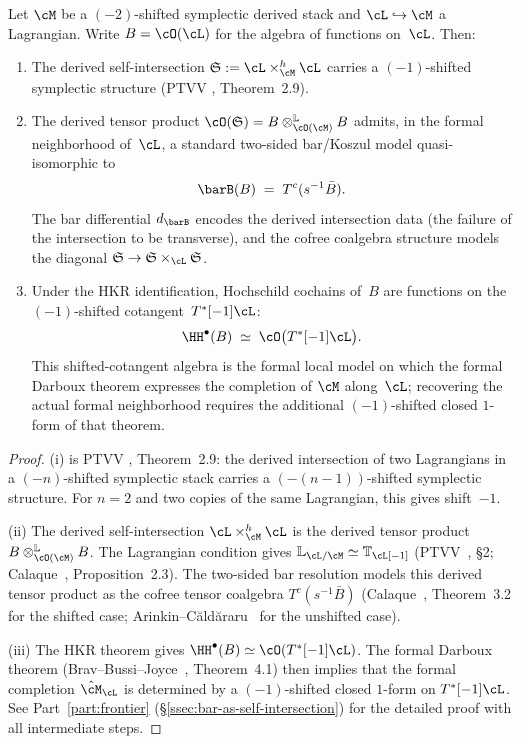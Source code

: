 \begin{theorem}
\label{thm:bar-is-self-intersection}
Let $\cM$ be a $(-2)$-shifted symplectic derived stack and
$\cL \hookrightarrow \cM$ a Lagrangian. Write
$B = \cO(\cL)$ for the algebra of functions on~$\cL$.
Then:
\begin{enumerate}[label=\textup{(\roman*)},leftmargin=2em]
\item The derived self-intersection
 $\Steinb := \cL \times_{\cM}^h \cL$
 carries a $(-1)$-shifted symplectic structure
 \textup{(}PTVV \cite{PTVV13}, Theorem~2.9\textup{)}.
\item The derived tensor product
 $\cO(\Steinb)=B\otimes^{\mathbb L}_{\cO(\cM)}B$
 admits, in the formal neighborhood of~$\cL$, a standard
 two-sided bar/Koszul model quasi-isomorphic to
 \[
 \barB(B)
 \;=\;
 T^c(s^{-1}\bar B).
 \]
 The bar differential $d_{\barB}$ encodes the derived
 intersection data \textup{(}the failure of the intersection to be
 transverse\textup{)}, and the cofree coalgebra structure models
 the diagonal
 $\Steinb \to \Steinb \times_{\cL} \Steinb$.
\item Under the HKR identification, Hochschild cochains of~$B$
 are functions on the $(-1)$-shifted cotangent~$T^*[-1]\cL$:
 \[
 \HH^\bullet(B)
 \;\simeq\;
 \cO\bigl(T^*[-1]\cL\bigr).
 \]
 This shifted-cotangent algebra is the formal local model on
 which the formal Darboux theorem expresses the completion of
 $\cM$ along~$\cL$; recovering the actual formal neighborhood
 requires the additional $(-1)$-shifted closed $1$-form of that
 theorem.
\end{enumerate}
\end{theorem}

\begin{proof}
(i) is PTVV \cite{PTVV13}, Theorem~2.9: the derived intersection
of two Lagrangians in a $(-n)$-shifted symplectic stack carries a
$(-(n-1))$-shifted symplectic structure. For $n = 2$ and two
copies of the same Lagrangian, this gives shift~$-1$.

(ii) The derived self-intersection
$\cL \times_\cM^h \cL$ is the derived tensor product
$B \otimes^{\mathbb{L}}_{\cO(\cM)} B$. The Lagrangian condition
gives $\mathbb{L}_{\cL/\cM} \simeq \mathbb{T}_\cL[-1]$
(PTVV~\cite{PTVV13}, \S2; Calaque~\cite{Cal15}, Proposition~2.3).
The two-sided bar resolution models this derived tensor product as
the cofree tensor coalgebra $T^c(s^{-1}\bar B)$
(Calaque~\cite{Cal15}, Theorem~3.2 for the shifted case;
Arinkin--C\u{a}ld\u{a}raru~\cite{AC12} for the unshifted case).

(iii) The HKR theorem gives
$\HH^\bullet(B) \simeq \cO(T^*[-1]\cL)$.
The formal Darboux theorem
(Brav--Bussi--Joyce~\cite{BBJ19}, Theorem~4.1) then implies that
the formal completion $\hat{\cM}_\cL$ is determined by a
$(-1)$-shifted closed $1$-form on $T^*[-1]\cL$.
See Part~\ref{part:frontier} (\S\ref{ssec:bar-as-self-intersection}) for the
detailed proof with all intermediate steps.
\end{proof}

